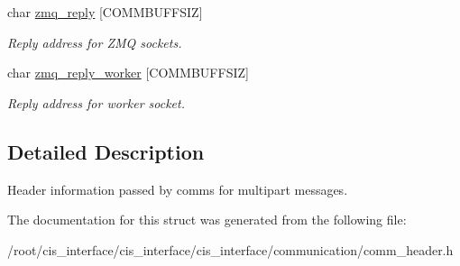 \begin{DoxyCompactItemize}
\mbox{\label{structcomm__head__t_a81034ab274964279115f5ce7669f055b}} 
char \mbox{\hyperlink{structcomm__head__t_a81034ab274964279115f5ce7669f055b}{zmq\+\_\+reply}} \mbox{[}C\+O\+M\+M\+B\+U\+F\+F\+S\+IZ\mbox{]}
\begin{DoxyCompactList}\small\item\em Reply address for Z\+MQ sockets. \end{DoxyCompactList}\item 
\mbox{\label{structcomm__head__t_a1367a9bb9ef1938d87897ab5685b01ef}} 
char \mbox{\hyperlink{structcomm__head__t_a1367a9bb9ef1938d87897ab5685b01ef}{zmq\+\_\+reply\+\_\+worker}} \mbox{[}C\+O\+M\+M\+B\+U\+F\+F\+S\+IZ\mbox{]}
\begin{DoxyCompactList}\small\item\em Reply address for worker socket. \end{DoxyCompactList}\end{DoxyCompactItemize}


\subsection{Detailed Description}
Header information passed by comms for multipart messages. 

The documentation for this struct was generated from the following file\+:\begin{DoxyCompactItemize}
\item 
/root/cis\+\_\+interface/cis\+\_\+interface/cis\+\_\+interface/communication/comm\+\_\+header.\+h\end{DoxyCompactItemize}
